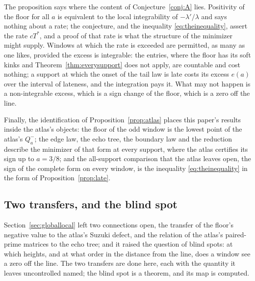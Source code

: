 \documentclass[11pt]{article}
\theoremstyle{definition}
\theoremstyle{remark}
\newcommand{\Tst}{T^{*}}
\begin{document}
The proposition says where the content of Conjecture~\ref{conj:A} lies. Positivity of the floor for all $a$ is equivalent to the local integrability of $-\lambda'/\lambda$ and says nothing about a rate; the conjecture, and the inequality \eqref{eq:theinequality}, assert the rate $c\Tst$, and a proof of that rate is what the structure of the minimizer might supply. Windows at which the rate is exceeded are permitted, as many as one likes, provided the excess is integrable: the entries, where the floor has its soft kinks and Theorem~\ref{thm:everysupport} does not apply, are countable and cost nothing; a support at which the onset of the tail law is late costs its excess $e(a)$ over the interval of lateness, and the integration pays it. What may not happen is a non-integrable excess, which is a sign change of the floor, which is a zero off the line.

Finally, the identification of Proposition~\ref{prop:atlas} places this paper's results inside the atlas's objects: the floor of the odd window is the lowest point of the atlas's $Q_a^-$; the edge law, the echo tree, the boundary law and the reduction describe the minimizer of that form at every support, where the atlas certifies its sign up to $a=3/8$; and the all-support comparison that the atlas leaves open, the sign of the complete form on every window, is the inequality \eqref{eq:theinequality} in the form of Proposition~\ref{prop:late}.


\subsection{Two transfers, and the blind spot}\label{sec:transfers}

Section~\ref{sec:globallocal} left two connections open, the transfer of the floor's negative value to the atlas's Suzuki defect, and the relation of the atlas's paired-prime matrices to the echo tree; and it raised the question of blind spots: at which heights, and at what order in the distance from the line, does a window see a zero off the line. The two transfers are done here, each with the quantity it leaves uncontrolled named; the blind spot is a theorem, and its map is computed.
\end{document}
